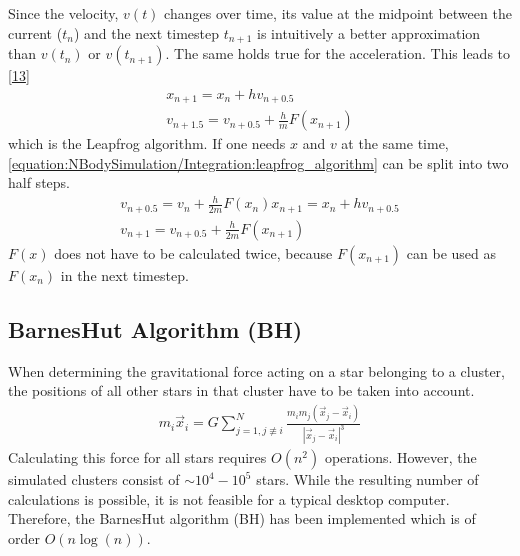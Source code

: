 \documentclass[letterpaper,10pt,english]{sphinxmanual}
\begin{document}
				\sphinxAtStartPar
				Since the velocity, \(v(t)\) changes over time, its value at the midpoint between the current (\(t_n\)) and the next timestep \(t_{n+1}\) is intuitively a better approximation than
				\(v(t_n)\) or \(v(t_{n+1})\). The same holds true for the acceleration. This leads to {[}\hyperlink{cite.NBodySimulation/Appendix:id27}{13}{]}
				\begin{equation}\label{equation:NBodySimulation/Integration:leapfrog_algorithm}
				\begin{split}x_{n+1} = x_{n} + hv_{n+0.5}\\
				v_{n+1.5} = v_{n+0.5} + \frac{h}{m}F(x_{n+1})\end{split}
				\end{equation}
				\sphinxAtStartPar
				which is the Leapfrog algorithm. If one needs \(x\) and \(v\) at the same time, \eqref{equation:NBodySimulation/Integration:leapfrog_algorithm} can be split into two half steps.
				\begin{equation*}
				\begin{split}v_{n+0.5} = v_{n} + \frac{h}{2m}F(x_{n})
				x_{n+1} = x_{n} + hv_{n+0.5}\\
				v_{n+1} = v_{n+0.5} + \frac{h}{2m}F(x_{n+1})\end{split}
				\end{equation*}
				\sphinxAtStartPar
				\(F(x)\) does not have to be calculated twice, because \(F(x_{n+1})\) can be used as \(F(x_{n})\) in the next timestep.
			
			
			\subsection{Barnes\sphinxhyphen{}Hut Algorithm (BH)}
				\label{\detokenize{NBodySimulation/Integration:barnes-hut-algorithm-bh}}
				\sphinxAtStartPar
				When determining the gravitational force acting on a star belonging to a cluster, the positions of all other stars in that cluster
				have to be taken into account.
				\begin{equation*}
				\begin{split}m_i\vec{x}_i = G\sum_{j=1,j\not\equiv i}^{N}\frac{m_im_j\left ( \vec{x}_j-\vec{x}_i \right )}{\left | \vec{x}_j-\vec{x}_i \right |^3}\end{split}
				\end{equation*}
				\sphinxAtStartPar
				Calculating this force for all stars requires \(O(n^2)\) operations.
				However, the simulated clusters consist of \(\sim 10^4 - 10^5\) stars.
				While the resulting number of calculations is possible, it is not feasible for a typical desktop computer.
				Therefore, the Barnes\sphinxhyphen{}Hut algorithm (BH) has been implemented which is of order \(O(n\log(n))\).
				
\end{document}
